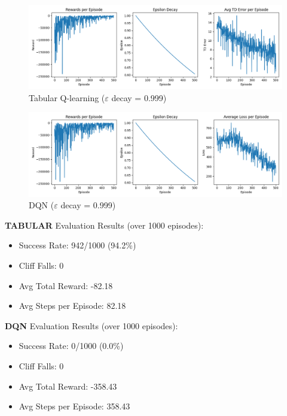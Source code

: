 \documentclass[a4paper,12pt]{article}
\begin{document}
\begin{figure}[H]
    \centering
    \includegraphics[width=\linewidth]{2_32_0999_64_slip_tab.png}
    \caption{Tabular Q-learning ($\varepsilon$ decay = 0.999)}
\end{figure}
\begin{figure}[H]
    \centering
    \includegraphics[width=\linewidth]{2_32_0999_64_slip_dqn.png}
    \caption{DQN ($\varepsilon$ decay = 0.999)}
\end{figure}
\noindent \textbf{TABULAR} Evaluation Results (over 1000 episodes):
\begin{itemize}
    \item Success Rate: 942/1000 (94.2\%)
    \item Cliff Falls: 0
    \item Avg Total Reward: -82.18
    \item Avg Steps per Episode: 82.18
\end{itemize}
\textbf{DQN} Evaluation Results (over 1000 episodes):
\begin{itemize}
    \item Success Rate: 0/1000 (0.0\%)
    \item Cliff Falls: 0
    \item Avg Total Reward: -358.43
    \item Avg Steps per Episode: 358.43
\end{itemize}
\end{document}
